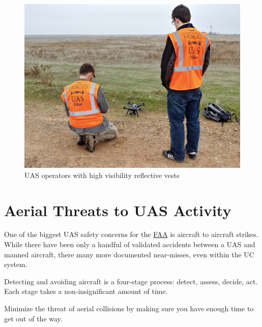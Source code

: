 \documentclass[
]{book}
\begin{document}
\begin{figure}

{\centering \includegraphics[width=0.7\linewidth]{images/UAS_Vest} 

}

\caption{UAS operators with high visibility reflective vests}\label{fig:uasvests}
\end{figure}

\hypertarget{aerial-threats-to-uas-activity}{%
\section{Aerial Threats to UAS Activity}\label{aerial-threats-to-uas-activity}}

One of the biggest UAS safety concerns for the \protect\hyperlink{FAA}{FAA} is aircraft to aircraft strikes. While there have been only a handful of validated accidents between a UAS and manned aircraft, there many more documented near-misses, even within the UC system.

Detecting and avoiding aircraft is a four-stage process: detect, assess, decide, act. Each stage takes a non-insignificant amount of time.

Minimize the threat of aerial collisions by making sure you have enough time to get out of the way.
\end{document}
